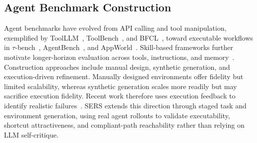 \subsection{Agent Benchmark Construction}

Agent benchmarks have evolved from API calling and tool manipulation, exemplified by ToolLLM~\citep{qin2024toolllm}, ToolBench~\citep{xu2023toolbench}, and BFCL~\citep{patil2025berkeley}, toward executable workflows in $\tau$-bench~\citep{yao2024tau}, AgentBench~\citep{liu2024agentbench}, and AppWorld~\citep{trivedi2024appworld}. Skill-based frameworks further motivate longer-horizon evaluation across tools, instructions, and memory~\citep{xu2026skills,openclaw}. Construction approaches include manual design, synthetic generation, and execution-driven refinement. Manually designed environments offer fidelity but limited scalability, whereas synthetic generation scales more readily but may sacrifice execution fidelity. Recent work therefore uses execution feedback to identify realistic failures~\citep{jones2026benign}. SERS extends this direction through staged task and environment generation, using real agent rollouts to validate executability, shortcut attractiveness, and compliant-path reachability rather than relying on LLM self-critique.